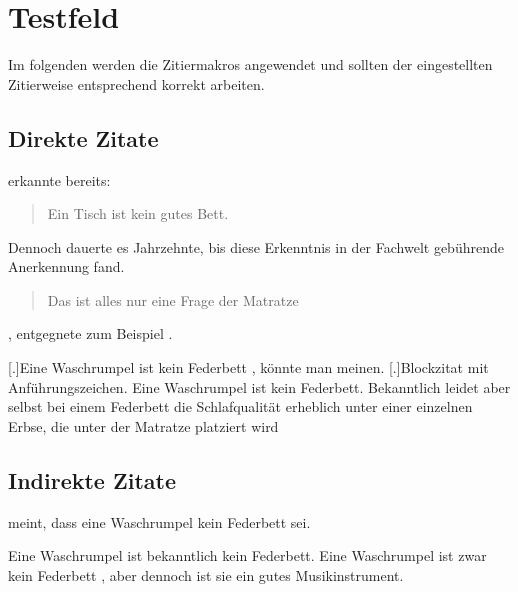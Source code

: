 \section{Testfeld}
Im folgenden werden die Zitiermakros angewendet und sollten der
eingestellten Zitierweise entsprechend korrekt arbeiten.
\subsection{Direkte Zitate}
\Textcite[123]{Niemand} erkannte bereits: \blockquote{Ein Tisch ist kein
gutes Bett.} Dennoch dauerte es Jahrzehnte, bis diese Erkenntnis in der
Fachwelt gebührende Anerkennung fand. \blockquote{Das ist alles nur eine
Frage der Matratze}, entgegnete zum Beispiel \textcite[12]{Autor}.

[.]{Eine Waschrumpel ist kein Federbett}
, könnte man meinen.
[.]{Blockzitat mit Anführungszeichen. Eine Waschrumpel
ist kein Federbett. Bekanntlich leidet aber selbst bei einem Federbett
die Schlafqualität erheblich unter einer einzelnen Erbse, die unter der
Matratze platziert wird}

\subsection{Indirekte Zitate}
\Textcite[\bibstring{confer}][123]{Autor} meint, dass eine Waschrumpel kein
Federbett sei.

Eine Waschrumpel ist bekanntlich kein Federbett.  Eine
Waschrumpel ist zwar kein Federbett , aber dennoch ist
sie ein gutes Musikinstrument.

